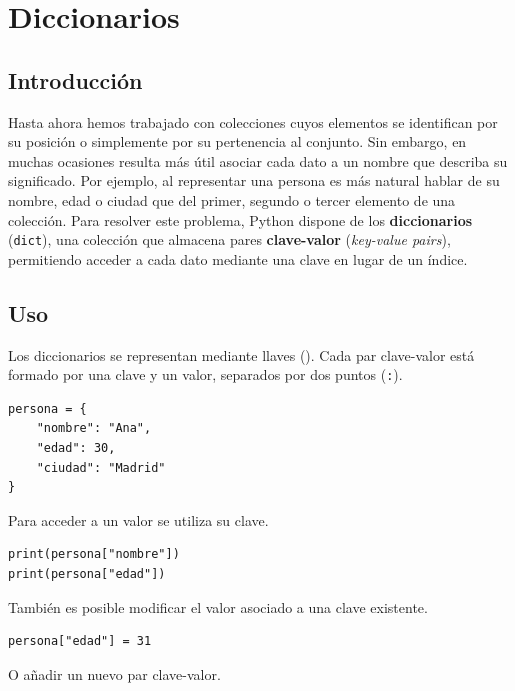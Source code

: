 \documentclass[11pt,a5paper,twoside]{book}
\begin{document}
\newpage

\section{Diccionarios}
\subsection{Introducción}
Hasta ahora hemos trabajado con colecciones cuyos elementos se identifican por su posición o simplemente por su pertenencia al conjunto. Sin embargo, en muchas ocasiones resulta más útil asociar cada dato a un nombre que describa su significado.
Por ejemplo, al representar una persona es más natural hablar de su nombre, edad o ciudad que del primer, segundo o tercer elemento de una colección.
Para resolver este problema, Python dispone de los \textbf{diccionarios} ({\scriptsize \texttt{dict}}), una colección que almacena pares \textbf{clave-valor} (\textit{key-value pairs}), permitiendo acceder a cada dato mediante una clave en lugar de un índice.
\subsection{Uso}
Los diccionarios se representan mediante llaves ({\scriptsize \texttt{{}}}). Cada par clave-valor está formado por una clave y un valor, separados por dos puntos ({\scriptsize \texttt{:}}).


\begin{tcolorbox}
\scriptsize
 \begin{verbatim}
persona = {
    "nombre": "Ana",
    "edad": 30,
    "ciudad": "Madrid"
}
\end{verbatim}
\end{tcolorbox}
Para acceder a un valor se utiliza su clave.


\begin{tcolorbox}
\scriptsize
 \begin{verbatim}
print(persona["nombre"])
print(persona["edad"])
\end{verbatim}
\end{tcolorbox}
También es posible modificar el valor asociado a una clave existente.


\begin{tcolorbox}
\scriptsize
 \begin{verbatim}
persona["edad"] = 31
\end{verbatim}
\end{tcolorbox}
O añadir un nuevo par clave-valor.
\end{document}
